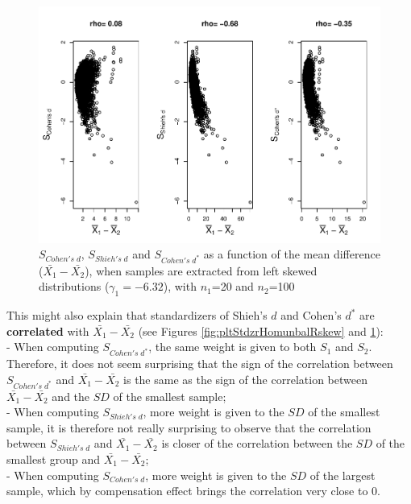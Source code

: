 \documentclass[
  english,
  man,mask,floatsintext]{apa6}
\begin{document}
\begin{figure}
\centering
\includegraphics{Correlation_files/figure-latex/pltStdzrHomunbalLskew-1.pdf}
\caption{\label{fig:pltStdzrHomunbalLskew}\(S_{Cohen's \; d}\), \(S_{Shieh's \; d}\) and \(S_{Cohen's \; d^*}\) as a function of the mean difference (\(\bar{X_1}-\bar{X_2}\)), when samples are extracted from left skewed distributions (\(\gamma_1 = -6.32\)), with \(n_1\)=20 and \(n_2\)=100}
\end{figure}

This might also explain that standardizers of Shieh's \(d\) and Cohen's \(d^*\) are \textbf{correlated} with \(\bar{X_1}-\bar{X_2}\) (see Figures \ref{fig:pltStdzrHomunbalRskew} and \ref{fig:pltStdzrHomunbalLskew}):\\
- When computing \(S_{Cohen's \; d^*}\), the same weight is given to both \(S_1\) and \(S_2\). Therefore, it does not seem surprising that the sign of the correlation between \(S_{Cohen's \; d^*}\) and \(\bar{X_1}-\bar{X_2}\) is the same as the sign of the correlation between \(\bar{X_1}-\bar{X_2}\) and the \(SD\) of the smallest sample;\\
- When computing \(S_{Shieh's \; d}\), more weight is given to the \(SD\) of the smallest sample, it is therefore not really surprising to observe that the correlation between \(S_{Shieh's \; d}\) and \(\bar{X_1}-\bar{X_2}\) is closer of the correlation between the \(SD\) of the smallest group and \(\bar{X_1}-\bar{X_2}\);\\
- When computing \(S_{Cohen's \; d}\), more weight is given to the \(SD\) of the largest sample, which by compensation effect brings the correlation very close to 0.
\end{document}
